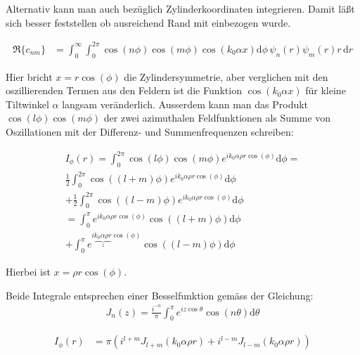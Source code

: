 \documentclass[DIV19,twocolumn]{scrartcl}
\def\({\left(}
\def\){\right)}
\begin{document}
Alternativ kann man auch bez\"uglich Zylinderkoordinaten
integrieren. Damit l\"a\ss t sich besser feststellen ob ausreichend
Rand mit einbezogen wurde.

\begin{align}
  \Re\{c_{nm}\}&=\int_0^{\infty}\!\!\!\!\int_0^{2\pi}\!\!\!\!\!\! \cos(n\phi)\cos(m\phi) \cos(k_0\alpha x) \textrm{d}\phi\, \psi_n(r) \psi_m(r) r\, \textrm{d}r 
\end{align}

Hier bricht $x=r \cos(\phi)$ die Zylindersymmetrie, aber verglichen
mit den oszillierenden Termen aus den Feldern ist die Funktion
$\cos(k_0\alpha x)$ f\"ur kleine Tiltwinkel $\alpha$ langsam
ver\"anderlich. Ausserdem kann man das Produkt
$\cos(l\phi)\cos(m\phi)$ der zwei azimuthalen Feldfunktionen als Summe
von Oszillationen mit der Differenz- und Summenfrequenzen schreiben:



\begin{align}
  I_\phi(r) = \int_0^{2\pi}\!\!\!\!\!\! \cos(l\phi)\cos(m\phi) e^{ik_0\alpha\rho r\cos(\phi)} \textrm{d}\phi = \nonumber \\
  \frac{1}{2}\int_0^{2\pi}\!\!\!\!\!\! \cos\((l+m)\phi\) e^{ik_0\alpha\rho r\cos(\phi)} \textrm{d}\phi  \nonumber \\
  + \frac{1}{2}\int_0^{2\pi}\!\!\!\!\!\! \cos\((l-m)\phi\) e^{ik_0\alpha\rho r\cos(\phi)} \textrm{d}\phi \nonumber \\
  =  \int_0^{\pi}\! e^{ik_0\alpha\rho r\cos(\phi)} \cos\((l+m)\phi\) \textrm{d}\phi  \nonumber \\
  + \int_0^{\pi}\! e^{i\underbrace{k_0\alpha\rho r}_z\cos(\phi)} \cos\((l-m)\phi\)  \textrm{d}\phi
\end{align}

Hierbei ist $x=\rho r \cos(\phi)$.

Beide Integrale entsprechen einer Besselfunktion gem\"ass der
Gleichung:
\begin{align}
  J_n(z) = \frac{i^{-n}}{\pi}\int_0^\pi e^{iz\cos\theta} \cos(n \theta) \textrm{d} \theta
\end{align}

\begin{align}
  I_\phi(r) &= \pi \(i^{l+m} J_{l+m}(k_0\alpha\rho r)+i^{l-m} J_{l-m}(k_0\alpha\rho r)\)
\end{align}
\end{document}
